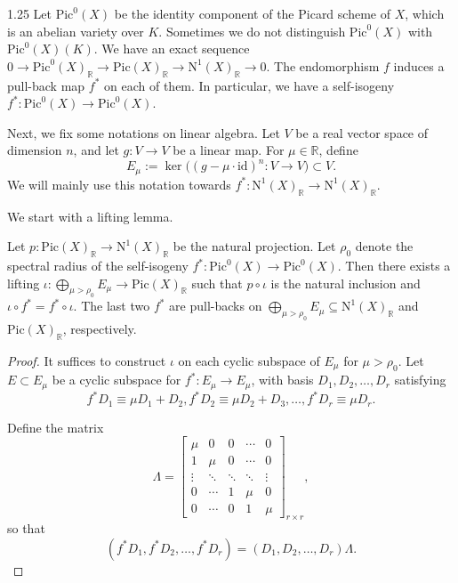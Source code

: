 \documentclass[12pt]{amsart}
\newcommand{\mb}[1]{\mathbb{#1}}
\newcommand{\mr}[1]{\mathrm{#1}}
\newcommand\ra{\rightarrow}
\begin{document}
\begin{spacing}{1.25}
Let $\mathrm{Pic}^0(X)$ be the identity component of the Picard scheme of $X$, which is an abelian variety over $K$. Sometimes we do not distinguish $\mathrm{Pic}^0(X)$ with $\mathrm{Pic}^0(X)(K)$. We have an exact sequence $0\rightarrow\mathrm{Pic}^0(X)_{\mathbb{R}}\rightarrow\mathrm{Pic}(X)_{\mathbb{R}}\rightarrow\mathrm{N}^1(X)_{\mathbb{R}}\rightarrow 0$. The endomorphism $f$ induces a pull-back map $f^*$ on each of them. In particular, we have a self-isogeny $f^*:\mathrm{Pic}^0(X)\rightarrow\mathrm{Pic}^0(X)$.

Next, we fix some notations on linear algebra. Let $V$ be a real vector space of dimension $n$, and let $g: V\ra V$ be a linear map. For $\mu\in \mb{R}$, define 
\[E_\mu:=\ker\big((g-\mu\cdot\mr{id})^n:V\ra V\big)\subset V.\]
We will mainly use this notation towards $f^*:\mathrm{N}^1(X)_{\mathbb{R}}\ra\mathrm{N}^1(X)_{\mathbb{R}}$.

We start with a lifting lemma.

\begin{lemma}\label{Lem_lift}
Let $p: \mr{Pic}(X)_{\mb{R}}\ra \mr{N}^1(X)_{\mb{R}}$ be the natural projection. Let $\rho_0$ denote the spectral radius of the self-isogeny $f^*: \mr{Pic}^0(X)\ra \mr{Pic}^0(X)$. Then there exists a lifting $\iota: \bigoplus\limits_{\mu>\rho_0}E_{\mu}\ra \mr{Pic}(X)_{\mb{R}}$ such that $p\circ\iota$ is the natural inclusion and $\iota\circ f^*=f^*\circ\iota$. The last two $f^*$ are pull-backs on $\bigoplus\limits_{\mu>\rho_0}E_{\mu}\subseteq\mathrm{N}^1(X)_{\mathbb{R}}$ and $\mathrm{Pic}(X)_{\mathbb{R}}$, respectively.
\end{lemma}

\begin{proof}
It suffices to construct $\iota$ on each cyclic subspace of $E_\mu$ for $\mu > \rho_0$. Let $E \subset E_\mu$ be a cyclic subspace for $f^*: E_\mu \to E_\mu$, with basis $D_1, D_2, \ldots, D_r$ satisfying
\[f^*D_1\equiv \mu D_1+D_2, f^*D_2\equiv\mu D_2+D_3,\ldots, f^*D_r\equiv\mu D_r.\]

Define the matrix
\[
\Lambda = 
\begin{bmatrix}
\mu & 0 & 0 & \cdots & 0 \\
1 & \mu & 0 & \cdots & 0 \\
\vdots & \ddots & \ddots & \ddots & \vdots \\
0 & \cdots & 1 & \mu & 0 \\
0 & \cdots & 0 & 1 & \mu
\end{bmatrix}_{r\times r},
\]
so that
\[(f^*D_1,f^*D_2,\ldots,f^*D_r)=(D_1,D_2,\ldots,D_r)\Lambda.\]


\end{proof}
\end{spacing}
\end{document}
